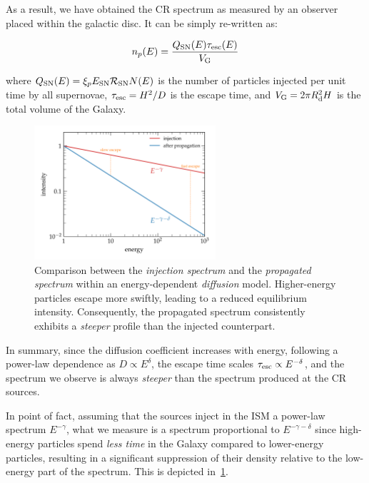 As a result, we have obtained the CR spectrum as measured by an observer placed within the galactic disc.
%
It can be simply re-written as:
%
\begin{remark}
\begin{equation}
n_p(E) = \frac{Q_{\rm SN}(E) \tau_{\rm esc}(E)}{V_{\rm G}}
\end{equation}
\end{remark}
%
where $Q_{\rm SN}(E) = \xi_p E_{\rm SN} \mathcal R_{\rm SN} N(E)$ is the number of particles injected per unit time by all supernovae, $\tau_{\rm esc} = H^2/D$ is the escape time, and $V_{\rm G} = 2\pi R_{\rm d}^2H$ is the total volume of the Galaxy.

\begin{figure}[t]
\centering
\includegraphics[width=0.6\textwidth]{figures/diffusion_softening.pdf}
\caption{Comparison between the \emph{injection spectrum} and the \emph{propagated spectrum} within an energy-dependent \emph{diffusion} model. Higher-energy particles escape more swiftly, leading to a reduced equilibrium intensity. Consequently, the propagated spectrum consistently exhibits a \emph{steeper} profile than the injected counterpart.}
\label{fig:softening}
\end{figure}

In summary, since the diffusion coefficient increases with energy, following a power-law dependence as $D \propto E^{\delta}$, the escape time scales $\tau_{\rm esc} \propto E^{-\delta}$, and the spectrum we observe is always \emph{steeper} than the spectrum produced at the CR sources.

In point of fact, assuming that the sources inject in the ISM a power-law spectrum $E^{-\gamma}$, what we measure is a spectrum proportional to $E^{-\gamma-\delta}$ since high-energy particles spend \emph{less time} in the Galaxy compared to lower-energy particles, resulting in a significant suppression of their density relative to the low-energy part of the spectrum.
%
This is depicted in~\ref{fig:softening}. 

